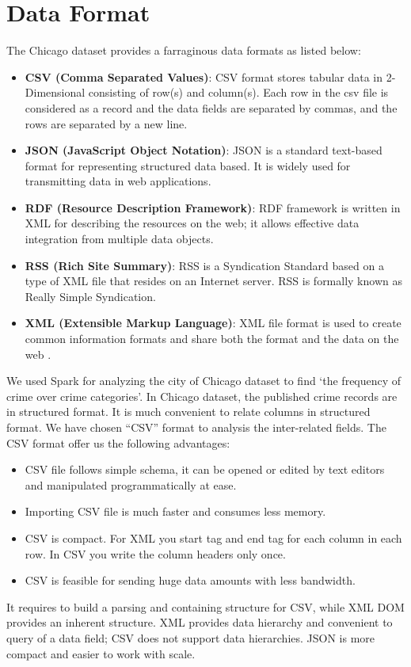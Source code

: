 \section{Data Format}

The Chicago dataset provides a farraginous data formats as listed below:
\begin{itemize}
    \item \textbf{CSV (Comma Separated Values)}: CSV format stores tabular data in 2-Dimensional consisting of row(s) and column(s). Each row in the csv file is considered as a record and the data fields are separated by commas, and the rows are separated by a new line\cite{csv}.
    \item \textbf{JSON (JavaScript Object Notation)}: JSON is a standard text-based format for representing structured data based. It is widely used for transmitting data in web applications\cite{json}.
    \item \textbf{RDF (Resource Description Framework)}: RDF framework is written in XML for describing the resources on the web; it allows effective data integration from multiple data objects\cite{rdf}.
    \item \textbf{RSS (Rich Site Summary)}: RSS is a Syndication Standard based on a type of XML file that resides on an Internet server. RSS is formally known as Really Simple Syndication\cite{rss}.
    \item \textbf{XML (Extensible Markup Language)}: XML file format is used to create common information formats and share both the format and the data on the web \cite{xml}.
\end{itemize}

We used Spark for analyzing the city of Chicago dataset to find ‘the frequency of crime over crime categories’. In Chicago dataset, the published crime records are in structured format. It is much convenient to relate columns in structured format. We have chosen “CSV” format to analysis the inter-related fields.\newline
The CSV format offer us the following advantages\cite{csv_advantage}:
\begin{itemize}
    \item CSV file follows simple schema, it can be opened or edited by text editors and manipulated programmatically at ease.
    \item Importing CSV file is much faster and consumes less memory.
    \item CSV is compact. For XML you start tag and end tag for each column in each row. In CSV you write the column headers only once.
    \item CSV is feasible for sending huge data amounts with less bandwidth.
\end{itemize}

It requires to build a parsing and containing structure for CSV, while XML DOM provides an inherent structure. XML provides data hierarchy and convenient to query of a data field; CSV does not support data hierarchies. JSON is more compact and easier to work with scale\cite{json_advantage}.






